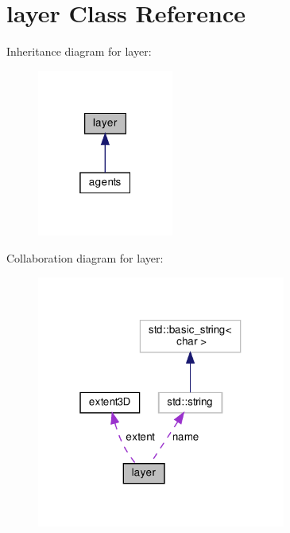 \hypertarget{classlayer}{}\section{layer Class Reference}
\label{classlayer}


Inheritance diagram for layer\+:
\nopagebreak
\begin{figure}[H]
\begin{center}
\leavevmode
\includegraphics[width=127pt]{classlayer__inherit__graph}
\end{center}
\end{figure}


Collaboration diagram for layer\+:
\nopagebreak
\begin{figure}[H]
\begin{center}
\leavevmode
\includegraphics[width=232pt]{classlayer__coll__graph}
\end{center}
\end{figure}
